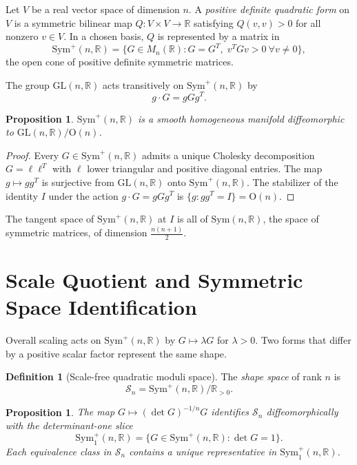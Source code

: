 \documentclass[12pt]{article}
\newtheorem{proposition}[theorem]{Proposition}
\theoremstyle{definition}
\newtheorem{definition}[theorem]{Definition}
\theoremstyle{remark}
\newcommand{\R}{\mathbb{R}}
\newcommand{\GL}{\mathrm{GL}}
\newcommand{\Sym}{\mathrm{Sym}}
\newcommand{\Symp}{\mathrm{Sym}^{+}}
\newcommand{\calM}{\mathcal{S}}
\begin{document}
Let $V$ be a real vector space of dimension $n$.
A \emph{positive definite quadratic form} on $V$ is a symmetric
bilinear map $Q : V \times V \to \R$ satisfying $Q(v,v) > 0$ for
all nonzero $v \in V$.
In a chosen basis, $Q$ is represented by a matrix in
\[
  \Symp(n,\R)
  = \{G \in M_n(\R) : G = G^T,\; v^T G v > 0\ \forall v \neq 0\},
\]
the open cone of positive definite symmetric matrices.

The group $\GL(n,\R)$ acts transitively on $\Symp(n,\R)$ by
\[
  g \cdot G = g G g^T.
\]

\begin{proposition}
\label{prop:homogeneous}
$\Symp(n,\R)$ is a smooth homogeneous manifold diffeomorphic to
$\GL(n,\R)/\mathrm{O}(n)$.
\end{proposition}

\begin{proof}
Every $G \in \Symp(n,\R)$ admits a unique Cholesky decomposition
$G = \ell\ell^T$ with $\ell$ lower triangular and positive diagonal
entries.
The map $g \mapsto g g^T$ is surjective from $\GL(n,\R)$ onto
$\Symp(n,\R)$.
The stabilizer of the identity $I$ under the action
$g \cdot G = gGg^T$ is $\{g : gg^T = I\} = \mathrm{O}(n)$.
\end{proof}

The tangent space of $\Symp(n,\R)$ at $I$ is all of $\Sym(n,\R)$,
the space of symmetric matrices, of dimension $\frac{n(n+1)}{2}$.

\section{Scale Quotient and Symmetric Space Identification}
\label{sec:scale}

Overall scaling acts on $\Symp(n,\R)$ by $G \mapsto \lambda G$ for
$\lambda > 0$.
Two forms that differ by a positive scalar factor represent the same
shape.

\begin{definition}[Scale-free quadratic moduli space]
The \emph{shape space} of rank $n$ is
\[
  \calM_n = \Symp(n,\R)/\R_{>0}.
\]
\end{definition}

\begin{proposition}
\label{prop:det1slice}
The map $G \mapsto (\det G)^{-1/n} G$ identifies $\calM_n$
diffeomorphically with the determinant-one slice
\[
  \Symp_1(n,\R)
  = \{G \in \Symp(n,\R) : \det G = 1\}.
\]
Each equivalence class in $\calM_n$ contains a unique representative
in $\Symp_1(n,\R)$.
\end{proposition}
\end{document}
